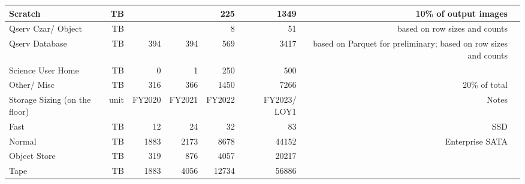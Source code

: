 \begin{longtable} { |p{}  |r  |r  |r  |r  |r  |r  |r |}
{Scratch}&{TB}&{}&{}&{225}&{1349}&{10\% of output images} \\ \hline
{Qserv Czar/ Object}&{TB}&{}&{}&{8}&{51}&{based on row sizes and counts} \\ \hline
{Qserv Database}&{TB}&{394}&{394}&{569}&{3417}&{based on Parquet for preliminary; based on row sizes and counts} \\ \hline
{Science User Home}&{TB}&{0}&{1}&{250}&{500}& \\ \hline
{Other/ Misc}&{TB}&{316}&{366}&{1450}&{7266}&{20\% of total} \\ \hline
{Storage Sizing (on the floor)}&{unit}&{FY2020}&{FY2021}&{FY2022}&{FY2023/ LOY1}&{Notes} \\ \hline
{Fast}&{TB}&{12}&{24}&{32}&{83}&{SSD} \\ \hline
{Normal}&{TB}&{1883}&{2173}&{8678}&{44152}&{Enterprise SATA} \\ \hline
{Object Store}&{TB}&{319}&{876}&{4057}&{20217}& \\ \hline
{Tape}&{TB}&{1883}&{4056}&{12734}&{56886}& \\ \hline
\end{longtable} \normalsize
